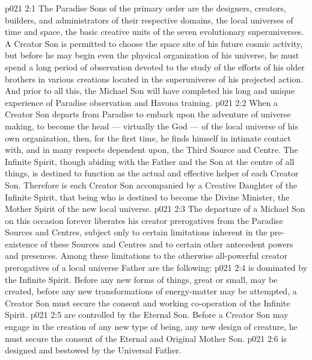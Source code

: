 \vs p021 2:1 The Paradise Sons of the primary order are the designers, creators, builders, and administrators of their respective domains, the local universes of time and space, the basic creative units of the seven evolutionary superuniverses. A Creator Son is permitted to choose the space site of his future cosmic activity, but before he may begin even the physical organization of his universe, he must spend a long period of observation devoted to the study of the efforts of his older brothers in various creations located in the superuniverse of his projected action. And prior to all this, the Michael Son will have completed his long and unique experience of Paradise observation and Havona training.
\vs p021 2:2 \pc When a Creator Son departs from Paradise to embark upon the adventure of universe making, to become the head --- virtually the God --- of the local universe of his own organization, then, for the first time, he finds himself in intimate contact with, and in many respects dependent upon, the Third Source and Centre. The Infinite Spirit, though abiding with the Father and the Son at the centre of all things, is destined to function as the actual and effective helper of each Creator Son. Therefore is each Creator Son accompanied by a Creative Daughter of the Infinite Spirit, that being who is destined to become the Divine Minister, the Mother Spirit of the new local universe.
\vs p021 2:3 The departure of a Michael Son on this occasion forever liberates his creator prerogatives from the Paradise Sources and Centres, subject only to certain limitations inherent in the pre\hyp{}existence of these Sources and Centres and to certain other antecedent powers and presences. Among these limitations to the otherwise all\hyp{}powerful creator prerogatives of a local universe Father are the following:
\vs p021 2:4 \bibnobreakspace {} is dominated by the Infinite Spirit. Before any new forms of things, great or small, may be created, before any new transformations of energy\hyp{}matter may be attempted, a Creator Son must secure the consent and working co\hyp{}operation of the Infinite Spirit.
\vs p021 2:5 \bibnobreakspace {} are controlled by the Eternal Son. Before a Creator Son may engage in the creation of any new type of being, any new design of creature, he must secure the consent of the Eternal and Original Mother Son.
\vs p021 2:6 \bibnobreakspace {} is designed and bestowed by the Universal Father.
